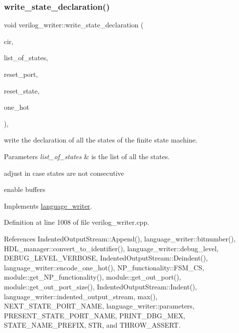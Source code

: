 \subsubsection{\texorpdfstring{write\+\_\+state\+\_\+declaration()}{write\_state\_declaration()}}
{\footnotesize\ttfamily void verilog\+\_\+writer\+::write\+\_\+state\+\_\+declaration (\begin{DoxyParamCaption}\item[{const \hyperlink{structural__objects_8hpp_a8ea5f8cc50ab8f4c31e2751074ff60b2}{structural\+\_\+object\+Ref} \&}]{cir,  }\item[{const std\+::list$<$ std\+::string $>$ \&}]{list\+\_\+of\+\_\+states,  }\item[{const std\+::string \&}]{reset\+\_\+port,  }\item[{const std\+::string \&}]{reset\+\_\+state,  }\item[{bool}]{one\+\_\+hot }\end{DoxyParamCaption})\hspace{0.3cm}{\ttfamily [override]}, {\ttfamily [virtual]}}



write the declaration of all the states of the finite state machine. 


\begin{DoxyParams}{Parameters}
{\em list\+\_\+of\+\_\+states} & is the list of all the states. \\
\hline
\end{DoxyParams}
adjust in case states are not consecutive

enable buffers 

Implements \hyperlink{classlanguage__writer_a3325b6d77049e7f4bf39b1c4758df5e8}{language\+\_\+writer}.



Definition at line 1008 of file verilog\+\_\+writer.\+cpp.



References Indented\+Output\+Stream\+::\+Append(), language\+\_\+writer\+::bitnumber(), H\+D\+L\+\_\+manager\+::convert\+\_\+to\+\_\+identifier(), language\+\_\+writer\+::debug\+\_\+level, D\+E\+B\+U\+G\+\_\+\+L\+E\+V\+E\+L\+\_\+\+V\+E\+R\+B\+O\+SE, Indented\+Output\+Stream\+::\+Deindent(), language\+\_\+writer\+::encode\+\_\+one\+\_\+hot(), N\+P\+\_\+functionality\+::\+F\+S\+M\+\_\+\+CS, module\+::get\+\_\+\+N\+P\+\_\+functionality(), module\+::get\+\_\+out\+\_\+port(), module\+::get\+\_\+out\+\_\+port\+\_\+size(), Indented\+Output\+Stream\+::\+Indent(), language\+\_\+writer\+::indented\+\_\+output\+\_\+stream, max(), N\+E\+X\+T\+\_\+\+S\+T\+A\+T\+E\+\_\+\+P\+O\+R\+T\+\_\+\+N\+A\+ME, language\+\_\+writer\+::parameters, P\+R\+E\+S\+E\+N\+T\+\_\+\+S\+T\+A\+T\+E\+\_\+\+P\+O\+R\+T\+\_\+\+N\+A\+ME, P\+R\+I\+N\+T\+\_\+\+D\+B\+G\+\_\+\+M\+EX, S\+T\+A\+T\+E\+\_\+\+N\+A\+M\+E\+\_\+\+P\+R\+E\+F\+IX, S\+TR, and T\+H\+R\+O\+W\+\_\+\+A\+S\+S\+E\+RT.



